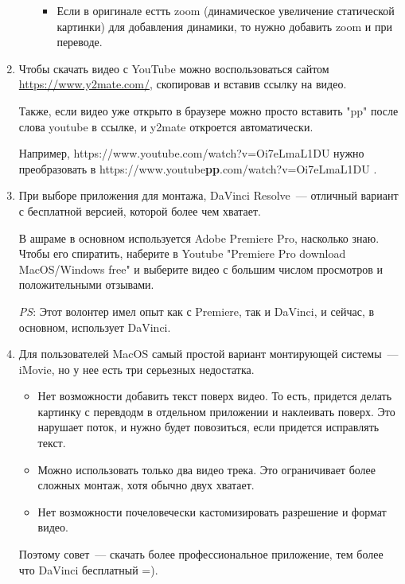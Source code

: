 \documentclass[
a4paper, %
12pt, %
article,
onecolumn, %
openany, %
]{memoir}
\begin{document}
\begin{enumerate}
\begin{itemize}
\begin{itemize}
            \item Если в оригинале естть zoom (динамическое увеличение
                статической картинки) для добавления динамики, то нужно
                добавить zoom и при переводе.

        \end{itemize}
    \end{itemize}
\item Чтобы скачать видео с YouTube можно воспользоваться сайтом
    \href{https://www.y2mate.com/}{https://www.y2mate.com/}, скопировав и вставив 
    ссылку на видео. 

    Также, если видео уже открыто в браузере можно просто вставить "pp" после
    слова youtube в ссылке, и y2mate откроется автоматически.

    Например, https://www.youtube.com/watch?v=Oi7eLmaL1DU нужно преобразовать
    в https://www.youtube\textbf{pp}.com/watch?v=Oi7eLmaL1DU .
\item При выборе приложения для монтажа, DaVinci Resolve~---
    отличный вариант с бесплатной версией, которой более чем хватает. 

В ашраме в основном используется Adobe Premiere Pro, насколько знаю. 
Чтобы его спиратить, наберите в Youtube "Premiere Pro download
MacOS/Windows free" и выберите видео с большим числом просмотров и положительными отзывами.

\emph{PS}: Этот волонтер имел опыт как с Premiere, так и DaVinci, и
сейчас, в основном, использует DaVinci.
\item Для пользователей MacOS самый простой вариант монтирующей системы~--- 
    iMovie, но у нее есть три серьезных недостатка.
    \begin{itemize}
    \item Нет возможности добавить текст поверх видео. То есть, придется делать
        картинку с перевдодм в отдельном приложении и наклеивать поверх.
        Это нарушает поток, и нужно будет повозиться, если придется исправлять текст.
    \item Можно использовать только два видео трека. Это ограничивает более 
        сложных монтаж, хотя обычно двух хватает.
    \item Нет возможности почеловечески кастомизировать разрешение и формат видео. 
\end{itemize}
    Поэтому совет~--- скачать более профессиональное приложение, тем более что
    DaVinci бесплатный =).
\end{enumerate}
\end{document}
